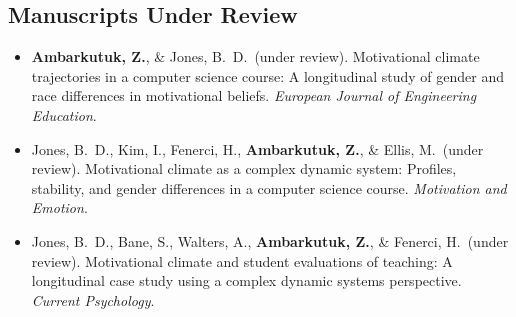 \documentclass[letterpaper,11pt]{article}
\newenvironment{refs}%
  {\begin{itemize}[leftmargin=2.2em, labelwidth=1.8em, labelsep=0.4em, align=left,
                   itemsep=3pt, parsep=0pt, topsep=2pt]}%
  {\end{itemize}}
\newcommand{\me}{\textbf{Ambarkutuk, Z.}}
\begin{document}
\subsection{Manuscripts Under Review}
\begin{refs}
  \item[{[3]}] \me, \& Jones, B.\ D.\ (under review). Motivational climate trajectories in a computer science course: A longitudinal study of gender and race differences in motivational beliefs. \textit{European Journal of Engineering Education}.
  \item[{[2]}] Jones, B.\ D., Kim, I., Fenerci, H., \me, \& Ellis, M.\ (under review). Motivational climate as a complex dynamic system: Profiles, stability, and gender differences in a computer science course. \textit{Motivation and Emotion}.
  \item[{[1]}] Jones, B.\ D., Bane, S., Walters, A., \me, \& Fenerci, H.\ (under review). Motivational climate and student evaluations of teaching: A longitudinal case study using a complex dynamic systems perspective. \textit{Current Psychology}.
\end{refs}

\end{document}

